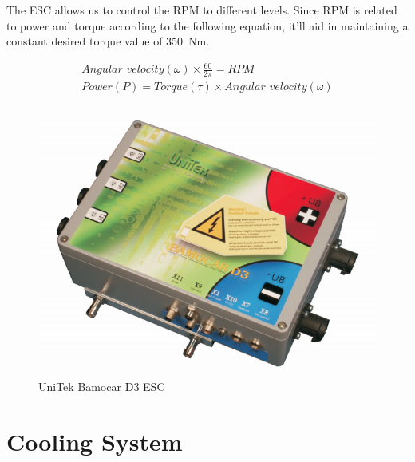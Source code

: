 \documentclass[main.tex]{subfiles}
\begin{document}
	The ESC allows us to control the RPM to different levels. Since RPM is related to power and torque according to the following equation, it'll aid in maintaining a constant desired torque value of \SI{350}{Nm}.

     \begin{gather*}
     	\textit{Angular velocity} (\omega) \times \frac{60}{2\pi} = \textit{RPM}\\
     	\textit{Power} (P) = \textit{Torque} (\tau)  \times \textit{Angular velocity} (\omega)\\
     \end{gather*}
     
    \begin{figure}[H]
        \centering
        \includegraphics[width=\linewidth]{images/fig17}
        \caption{UniTek Bamocar D3 ESC}
    \end{figure}

    \section{Cooling System}
\end{document}
